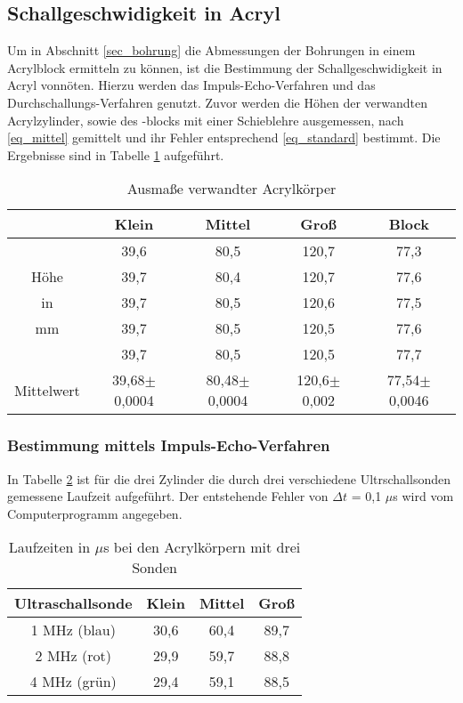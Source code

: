 \subsection{Schallgeschwidigkeit in Acryl}
Um in Abschnitt \ref{sec_bohrung} die Abmessungen der Bohrungen in einem Acrylblock ermitteln zu können, ist die Bestimmung der Schallgeschwidigkeit 
in Acryl vonnöten. Hierzu werden das Impuls-Echo-Verfahren und das Durchschallungs-Verfahren genutzt. Zuvor werden die Höhen der verwandten
Acrylzylinder, sowie des -blocks mit einer Schieblehre ausgemessen, nach \eqref{eq_mittel} gemittelt und ihr Fehler entsprechend 
\eqref{eq_standard} bestimmt. Die Ergebnisse sind in Tabelle \ref{tab_masse} aufgeführt.

\begin{table}[H]
 \begin{tabular}{c|c|c|c|c}
  & Klein & Mittel & Groß & Block\\
  \hline
	&39,6&	80,5&	120,7&	77,3\\
Höhe 	&39,7&	80,4&	120,7&	77,6\\
in 	&39,7&	80,5&	120,6&	77,5\\
mm 	&39,7&	80,5&	120,5&	77,6\\
	&39,7&	80,5&	120,5&	77,7\\
	\hline
Mittelwert	&39,68$\pm$0,0004&	80,48$\pm$0,0004 &	120,6$\pm$0,002&	77,54$\pm$0,0046
 \end{tabular}
 \caption{Ausmaße verwandter Acrylkörper}
\label{tab_masse}
\end{table}

\subsubsection{Bestimmung mittels Impuls-Echo-Verfahren}
In Tabelle \ref{tab_impulsecho} ist für die drei Zylinder die durch drei verschiedene Ultrschallsonden gemessene Laufzeit aufgeführt. Der
entstehende Fehler von $\Delta t$ = 0,1 $\mu$s wird vom Computerprogramm angegeben.

\begin{table}[H]
 \begin{tabular}{c|c|c|c}
 Ultraschallsonde & Klein & Mittel & Groß\\
 \hline
1 MHz (blau)&	30,6&	60,4&	89,7\\
2 MHz (rot)&	29,9&	59,7&	88,8\\
4 MHz (grün)&	29,4&	59,1&	88,5\\  
 \end{tabular}
\caption{Laufzeiten in $\mu$s bei den Acrylkörpern mit drei Sonden}
\label{tab_impulsecho}
\end{table}

